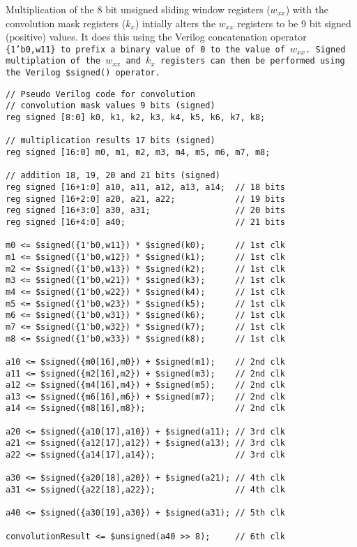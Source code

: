 \documentclass[10pt,twocolumn,letterpaper]{article}
\begin{document}
Multiplication of the 8 bit unsigned sliding window registers ($w_{xx}$) with the 
convolution mask registers ($k_{x}$) intially alters the $w_{xx}$ registers to be
9 bit signed (positive) values. It does this using the Verilog concatenation
operator \tt \footnotesize \{1'b0,w11\} \normalsize \rm to prefix a binary 
value of 0 to the value of $w_{xx}$. Signed multiplation of the $w_{xx}$ and
$k_{x}$ registers can then be performed using the Verilog
\tt\footnotesize \$signed() \hspace{-0.3cm} \normalsize \rm operator.

\scriptsize
\begin{verbatim}
// Pseudo Verilog code for convolution
// convolution mask values 9 bits (signed)
reg signed [8:0] k0, k1, k2, k3, k4, k5, k6, k7, k8;

// multiplication results 17 bits (signed)
reg signed [16:0] m0, m1, m2, m3, m4, m5, m6, m7, m8;

// addition 18, 19, 20 and 21 bits (signed)
reg signed [16+1:0] a10, a11, a12, a13, a14;  // 18 bits
reg signed [16+2:0] a20, a21, a22;            // 19 bits
reg signed [16+3:0] a30, a31;                 // 20 bits
reg signed [16+4:0] a40;                      // 21 bits

m0 <= $signed({1'b0,w11}) * $signed(k0);      // 1st clk 
m1 <= $signed({1'b0,w12}) * $signed(k1);      // 1st clk
m2 <= $signed({1'b0,w13}) * $signed(k2);      // 1st clk 
m3 <= $signed({1'b0,w21}) * $signed(k3);      // 1st clk 
m4 <= $signed({1'b0,w22}) * $signed(k4);      // 1st clk 
m5 <= $signed({1'b0,w23}) * $signed(k5);      // 1st clk 
m6 <= $signed({1'b0,w31}) * $signed(k6);      // 1st clk 
m7 <= $signed({1'b0,w32}) * $signed(k7);      // 1st clk 
m8 <= $signed({1'b0,w33}) * $signed(k8);      // 1st clk 

a10 <= $signed({m0[16],m0}) + $signed(m1);    // 2nd clk 
a11 <= $signed({m2[16],m2}) + $signed(m3);    // 2nd clk
a12 <= $signed({m4[16],m4}) + $signed(m5);    // 2nd clk 
a13 <= $signed({m6[16],m6}) + $signed(m7);    // 2nd clk 
a14 <= $signed({m8[16],m8});                  // 2nd clk 

a20 <= $signed({a10[17],a10}) + $signed(a11); // 3rd clk
a21 <= $signed({a12[17],a12}) + $signed(a13); // 3rd clk 
a22 <= $signed({a14[17],a14});                // 3rd clk 

a30 <= $signed({a20[18],a20}) + $signed(a21); // 4th clk 
a31 <= $signed({a22[18],a22});                // 4th clk 

a40 <= $signed({a30[19],a30}) + $signed(a31); // 5th clk 
	
convolutionResult <= $unsigned(a40 >> 8);     // 6th clk 
\end{verbatim}
\normalsize
\end{document}

